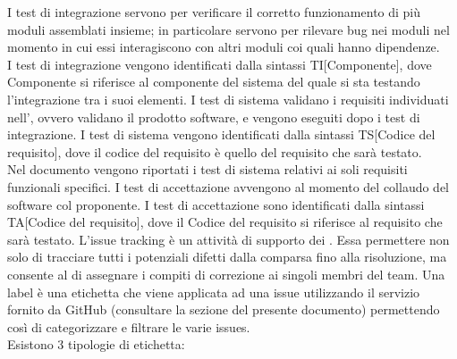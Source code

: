 					I test di integrazione servono per verificare il corretto funzionamento di più moduli assemblati insieme; in particolare servono per rilevare bug nei moduli nel momento in cui essi interagiscono con altri moduli coi quali hanno dipendenze.\\
					I test di integrazione vengono identificati dalla sintassi TI[Componente], dove Componente si riferisce al componente del sistema del quale si sta testando l'integrazione tra i suoi elementi.
					I test di sistema validano i requisiti individuati nell', ovvero validano il prodotto software, e vengono eseguiti dopo i test di integrazione.
					I test di sistema vengono identificati dalla sintassi TS[Codice del requisito], dove il codice del requisito è quello del requisito che sarà testato.\\
					Nel documento  vengono riportati i test di sistema relativi ai soli requisiti funzionali specifici.
					I test di accettazione avvengono al momento del collaudo del software col proponente.
					I test di accettazione sono identificati dalla sintassi TA[Codice del requisito], dove il Codice del requisito si riferisce al requisito che sarà testato.
			L'issue tracking è un attività di supporto dei . Essa permettere non solo di tracciare tutti i potenziali difetti dalla comparsa fino alla risoluzione, ma consente al  di assegnare i compiti di correzione ai singoli membri del team.
				\label{sec:SintassiLabel}
				Una label è una etichetta che viene applicata ad una issue utilizzando il servizio fornito da GitHub (consultare la sezione  del presente documento) permettendo così di categorizzare e filtrare le varie issues.\\
				Esistono 3 tipologie di etichetta:
